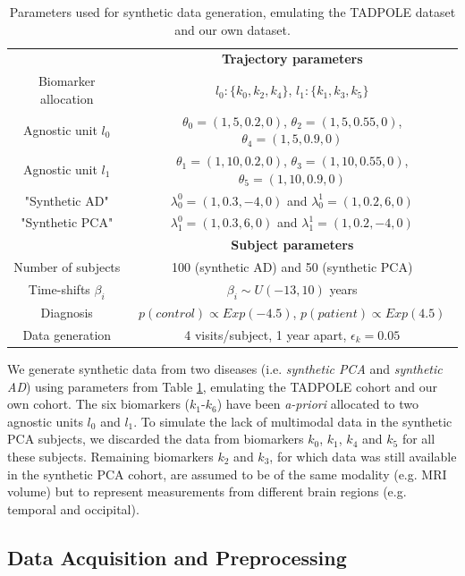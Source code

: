 \documentclass{llncs}
\begin{document}
 \begin{table}
 \begin{tabular}{c | c}
& \textbf{Trajectory parameters} \\
 Biomarker allocation &  $l_0:\{k_0, k_2, k_4\}$, $l_1: \{k_1, k_3, k_5\}$ \\
Agnostic unit $l_0$ &  $\theta_0 = (1,5,0.2,0)$, $\theta_2 = (1,5,0.55,0)$,  $\theta_4 = (1,5,0.9,0)$  \\
Agnostic unit $l_1$ & $\theta_1 = (1,10,0.2,0)$, $\theta_3 = (1,10,0.55,0)$, $\theta_5 = (1,10,0.9,0)$ \\
  
"Synthetic AD" & $\lambda_0^0 = (1, 0.3, -4, 0)$  and $\lambda_0^1 = (1, 0.2, 6, 0)$ \\
 "Synthetic PCA" & $\lambda_1^0 = (1, 0.3, 6, 0)$ and $\lambda_1^1 = (1, 0.2, -4, 0)$ \\
\hline
& \textbf{Subject parameters} \\
 Number of subjects & 100 (synthetic AD) and 50 (synthetic PCA) \\ 
 Time-shifts $\beta_i$ & $\beta_i \sim U(-13,10)$ years \\
 Diagnosis & $p(control) \propto Exp (-4.5)$,  $p(patient) \propto Exp (4.5)$\\
 Data generation & 4 visits/subject, 1 year apart, $\epsilon_k = 0.05$\\ 
\end{tabular}
\caption{Parameters used for synthetic data generation, emulating the TADPOLE dataset and our own dataset.}
\label{tab:synParams}
\end{table}

We generate synthetic data from two diseases (i.e. \emph{synthetic PCA} and \emph{synthetic AD}) using parameters from Table \ref{tab:synParams}, emulating the TADPOLE cohort and our own cohort. The six biomarkers ($k_1$-$k_6$) have been \emph{a-priori} allocated to two agnostic units $l_0$ and $l_1$. To simulate the lack of multimodal data in the synthetic PCA subjects, we discarded the data from biomarkers $k_0$, $k_1$, $k_4$ and $k_5$ for all these subjects. Remaining biomarkers $k_2$ and $k_3$, for which data was still available in the synthetic PCA cohort, are assumed to be of the same modality (e.g. MRI volume) but to represent measurements from different brain regions (e.g. temporal and occipital). 


\subsection{Data Acquisition and Preprocessing}
\end{document}
